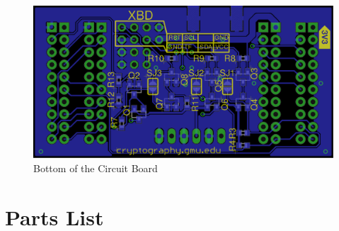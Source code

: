 \documentclass[twoside,11pt]{cergdoc}
\begin{document}
\begin{appendix}
\begin{figure}[ht]
  \begin{center}
    \includegraphics[scale=0.25]{figures/XBP-bottom}
    \caption{Bottom of the Circuit Board}
  \end{center}
\end{figure}
\chapter{Parts List}\label{sec:parts}

\end{appendix}
\end{document}
